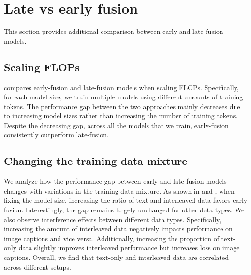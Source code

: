 \section{Late vs early fusion}
\label{app:late_vs_early}
This section provides additional comparison between early and late fusion models.

\subsection{Scaling FLOPs}  compares early-fusion and late-fusion models when scaling FLOPs. Specifically, for each model size, we train multiple models using different amounts of training tokens. The performance gap between the two approaches mainly decreases due to increasing model sizes rather than increasing the number of training tokens. Despite the decreasing gap, across all the models that we train, early-fusion consistently outperform late-fusion.




\subsection{Changing the training data mixture} We analyze how the performance gap between early and late fusion models changes with variations in the training data mixture. As shown in  and , when fixing the model size, increasing the ratio of text and interleaved data favors early fusion. Interestingly, the gap remains largely unchanged for other data types. We also observe interference effects between different data types. Specifically, increasing the amount of interleaved data negatively impacts performance on image captions and vice versa. Additionally, increasing the proportion of text-only data slightly improves interleaved performance but increases loss on image captions. Overall, we find that text-only and interleaved data are correlated across different setups.



    










